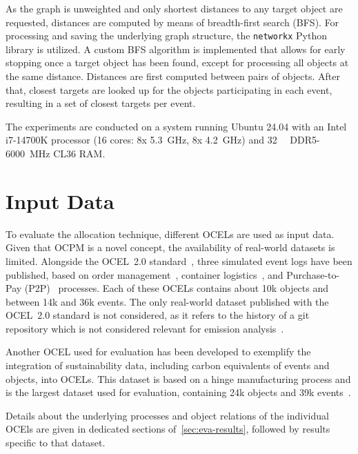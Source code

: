 As the graph is unweighted and only shortest distances to any target object are requested,
distances are computed by means of breadth-first search (BFS).
For processing and saving the underlying graph structure, the \texttt{networkx} Python library is utilized.
A custom BFS algorithm is implemented that allows for early stopping once a target object has been found, except for processing all objects at the same distance.
Distances are first computed between pairs of objects.
After that, closest targets are looked up for the objects participating in each event, resulting in a set of closest targets per event.

The experiments are conducted on a system running Ubuntu 24.04 with an Intel i7-14700K processor (16 cores: 8x \qty{5.3}{\giga\hertz}, 8x \qty{4.2}{\giga\hertz}) and \qty{32}{\giga\byte} DDR5-\qty{6000}{\mega\hertz} CL36 RAM.

\section{Input Data}
\label{sec:eva-input}

To evaluate the allocation technique, different OCELs are used as input data.
Given that OCPM is a novel concept, the availability of real-world datasets is limited.
Alongside the OCEL~2.0 standard~\cite{OCEL2}, three simulated event logs have been published, based on order management~\cite{orderManagement}, container logistics~\cite{containerLogistics}, and Purchase-to-Pay (P2P)~\cite{p2p} processes.
Each of these OCELs contains about 10k objects and between 14k and 36k events.
The only real-world dataset published with the OCEL~2.0 standard is not considered, as it refers to the history of a git repository which is not considered relevant for emission analysis~\cite{angularCommits}.

Another OCEL used for evaluation has been developed to exemplify the integration of sustainability data, including carbon equivalents of events and objects, into OCELs.
This dataset is based on a hinge manufacturing process and is the largest dataset used for evaluation, containing 24k objects and 39k events~\cite{hinge}.

Details about the underlying processes and object relations of the individual OCEls are given in dedicated sections of~\autoref{sec:eva-results}, followed by results specific to that dataset.

